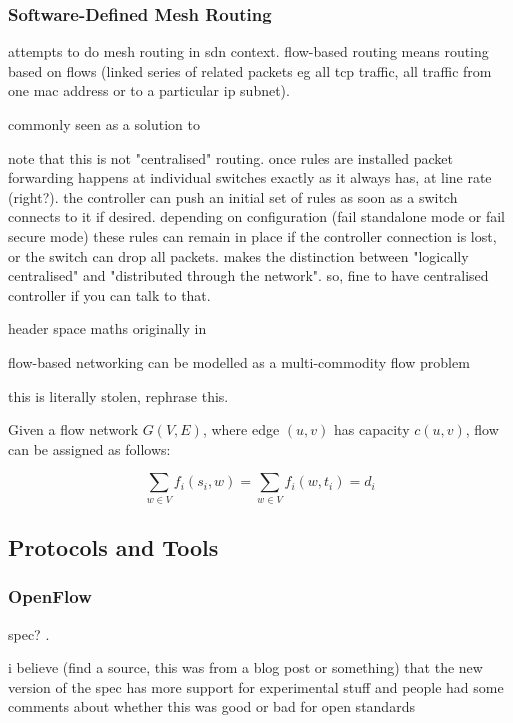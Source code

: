 \documentclass[pdftex,12pt,a4paper]{article}
\begin{document}
\subsubsection{Software-Defined Mesh Routing}
attempts to do mesh routing in sdn context. flow-based routing means routing based on flows (linked series of related packets eg all tcp traffic, all traffic from one mac address or to a particular ip subnet).

commonly seen as a solution to 

note that this is not "centralised" routing. once rules are installed packet forwarding happens at individual switches exactly as it always has, at line rate (right?). the controller can push an initial set of rules as soon as a switch connects to it if desired. depending on configuration (fail standalone mode or fail secure mode) these rules can remain in place if the controller connection is lost, or the switch can drop all packets. \cite{handigol:asterix} makes the distinction between "logically centralised" and "distributed through the network". so, fine to have centralised controller if you can talk to that. 

header space maths \cite{kazemian:header} originally in \cite{lakshman:geo}

flow-based networking can be modelled as a multi-commodity flow problem

this is literally stolen, rephrase this.

Given a flow network $G(V,E)$, where edge $(u,v)$ has capacity $c(u,v)$, flow can be assigned as follows:

\vspace{-0.5cm}
\begin{equation}
\sum\limits_{w \in V} f_i(s_i,w) = \sum\limits_{w \in V} f_i(w,t_i) = d_i
\end{equation}

\subsection{Protocols and Tools}
\subsubsection{OpenFlow}
spec? \cite{onf:switch140}. 

i believe (find a source, this was from a blog post or something) that the new version of the spec \cite{onf:switch140} has more support for experimental stuff and people had some comments about whether this was good or bad for open standards
\end{document}
